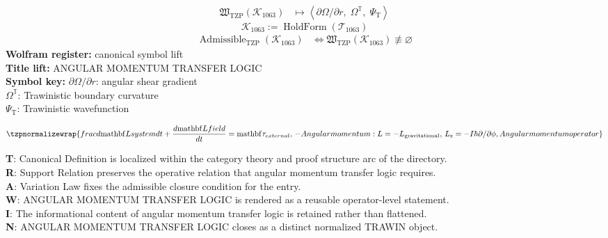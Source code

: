 \noindent
\begin{minipage}[t]{0.48\linewidth}
\begingroup
\small
\[
\begin{aligned}
\mathfrak{W}_{\mathrm{TZP}}\!\left(\mathcal{K}_{1063}\right)
&\longmapsto
\left\langle \partial\Omega/\partial r,\; \Omega^{\mathbb{T}},\; \Psi_{\mathrm{T}} \right\rangle
\end{aligned}
\]
\[
\mathcal{K}_{1063}
:=
\operatorname{HoldForm}\!\left(\mathcal{T}_{1063}\right)
\]
\[
\begin{aligned}
\operatorname{Admissible}_{\mathrm{TZP}}\!\left(\mathcal{K}_{1063}\right)
&\Longleftrightarrow
\mathfrak{W}_{\mathrm{TZP}}\!\left(\mathcal{K}_{1063}\right)\not\equiv\varnothing
\end{aligned}
\]
\textbf{Wolfram register:} canonical symbol lift\\
\textbf{Title lift:} ANGULAR MOMENTUM TRANSFER LOGIC\\
\textbf{Symbol key:} \(\partial\Omega/\partial r\): angular shear gradient\\ \(\Omega^{\mathbb{T}}\): Trawinistic boundary curvature\\ \(\Psi_{\mathrm{T}}\): Trawinistic wavefunction
\par
\endgroup
\end{minipage}\hfill
\begin{minipage}[t]{0.48\linewidth}
\[
\tzpnormalizewrap{frac{d\mathrm{mathbf}{L} {system}}{dt} + \frac{d\mathrm{mathbf}{L} {field}}{dt} = \mathrm{mathbf}{\tau}_{external},\,- Angular momentum: L = -L_{\mathrm{gravitational}},\,L_{\mathrm{z}} = -I \hbar \partial/\partial\phi, Angular momentum operator}
\]

\small
\textbf{T}: Canonical Definition is localized within the category theory and proof structure arc of the directory.\\
\textbf{R}: Support Relation preserves the operative relation that angular momentum transfer logic requires.\\
\textbf{A}: Variation Law fixes the admissible closure condition for the entry.\\
\textbf{W}: ANGULAR MOMENTUM TRANSFER LOGIC is rendered as a reusable operator-level statement.\\
\textbf{I}: The informational content of angular momentum transfer logic is retained rather than flattened.\\
\textbf{N}: ANGULAR MOMENTUM TRANSFER LOGIC closes as a distinct normalized TRAWIN object.
\normalsize
\end{minipage}

